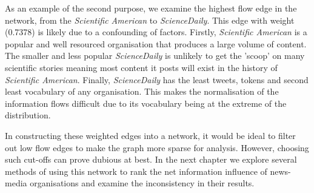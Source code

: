As an example of the second purpose, we examine the highest flow edge in the network, from the \emph{Scientific American} to \emph{ScienceDaily}.  This edge with weight (0.7378) is likely due to a confounding of factors. Firstly, \emph{Scientific American} is a popular and well resourced organisation that produces a large volume of content. The smaller and less popular \emph{ScienceDaily} is unlikely to get the 'scoop' on many scientific stories meaning most content it posts will exist in the history of \emph{Scientific American}. Finally, \emph{ScienceDaily} has the least tweets, tokens and second least vocabulary of any organisation. This makes the normalisation of the information flows difficult due to its vocabulary being at the extreme of the distribution. 

In constructing these weighted edges into a network, it would be ideal to filter out low flow edges to make the graph more sparse for analysis. However, choosing such cut-offs can prove dubious at best. In the next chapter we explore several methods of using this network to rank the net information influence of news-media organisations and examine the inconsistency in their results.


